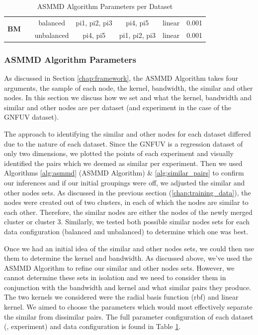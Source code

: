 \documentclass{mpaper}
\begin{document}
\begin{table}[]
\begin{tabular}{|ccc|cccc|}
\multicolumn{1}{|c|}{\multirow{2}{*}{\textbf{BM}}}    & \multicolumn{1}{c|}{}                    & balanced           & \multicolumn{1}{c|}{pi1, pi2, pi3}           & \multicolumn{1}{c|}{pi4, pi5}              & \multicolumn{1}{c|}{linear}          & 0.001              \\
\multicolumn{1}{|c|}{}                                & \multicolumn{1}{c|}{}                    & unbalanced         & \multicolumn{1}{c|}{pi4, pi5}                & \multicolumn{1}{c|}{pi1, pi2, pi3}         & \multicolumn{1}{c|}{linear}          & 0.001              \\ \hline
\end{tabular}
\caption{\label{tab:asmmd_parameters} ASMMD Algorithm Parameters per Dataset}
\end{table}


\subsubsection{ASMMD Algorithm Parameters}\label{chap:asmmd_parameters}

As discussed in Section \ref{chap:framework}, the ASMMD Algorithm  takes four arguments, the sample of each node, the kernel, bandwidth, the similar and other nodes. In this section we discuss how we set and what the kernel, bandwidth and similar and other nodes are per dataset (and experiment in the case of the GNFUV dataset). 

The approach to identifying the similar and other nodes for each dataset differed due to the nature of each dataset. Since the GNFUV is a regression dataset of only two dimensions, we plotted the points of each experiment and visually identified the pairs which we deemed as similar per experiment. Then we used Algorithms \ref{alg:asmmd} (ASMMD Algorithm) \& \ref{alg:similar_pairs} to confirm our inferences and if our initial groupings were off, we adjusted the similar and other nodes sets. As discussed in the previous section (\ref{chap:training_data}), the nodes were created out of two clusters, in each of which the nodes are similar to each other. Therefore, the similar nodes are either the nodes of the newly merged cluster or cluster 3. Similarly, we tested both possible similar nodes sets for each data configuration (balanced and unbalanced) to determine which one was best. 

Once we had an initial idea of the similar and other nodes sets, we could then use them to determine the kernel and bandwidth. As discussed above, we've used the ASMMD Algorithm to refine our similar and other nodes sets. However, we cannot determine these sets in isolation and we need to consider them in conjunction with the bandwidth and kernel and what similar pairs they produce. The two kernels we considered were the radial basis function (rbf) and linear kernel. We aimed to choose the parameters which would most effectively separate the similar from dissimilar pairs. The full parameter configuration of each dataset (, experiment) and data configuration is found in Table \ref{tab:asmmd_parameters}.
\end{document}

